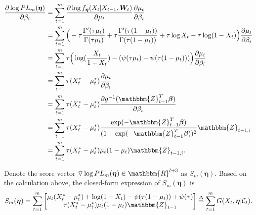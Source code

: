 \documentclass{article}
\theoremstyle{definition}
\begin{document}
\begin{equation*}
    \begin{aligned}
\frac{\partial \log PL_{m}(\bm{\eta})}{\partial \beta_i} & = \sum_{t=1}^m \frac{\partial \log f_{\bm{\eta}}(X_t|X_{t-1},\bm{W}_t)}{\partial \mu_t} \frac{\partial \mu_t}{\partial \beta_i} \\
&= \sum_{t=1}^m \Big(-\tau \frac{\Gamma'(\tau \mu_t)}{\Gamma(\tau \mu_t)}+\tau \frac{\Gamma'(\tau(1-\mu_t))}{\Gamma(\tau(1-\mu_t))}+\tau \log X_t -\tau \log(1-X_t) \Big)\frac{\partial \mu_t}{\partial \beta_i} \\
&= \sum_{t=1}^m  \tau\Big(\log(\frac{X_t}{1-X_t})-(\psi(\tau \mu_t)-\psi(\tau(1-\mu_t)))\Big)\frac{\partial \mu_t}{\partial \beta_i}\\
&= \sum_{t=1}^m  \tau(X_t^*-\mu_t^*) \frac{\partial \mu_t}{\partial \beta_i} \\
&= \sum_{t=1}^m \tau(X_t^*-\mu_t^*) \frac{\partial g^{-1}(\mathbbm{Z}_{t-1}^T \bm{\beta})}{\partial \beta_i} \\
&= \sum_{t=1}^m \tau(X_t^*-\mu_t^*) \frac{\exp(-\mathbbm{Z}_{t-1}^T \bm{\beta})}{(1+\exp(-\mathbbm{Z}_{t-1}^T \bm{\beta}))^2} \mathbbm{Z}_{t-1,i} \\
&= \sum_{t=1}^m \tau(X_t^*-\mu_t^*)\mu_t(1-\mu_t) \mathbbm{Z}_{t-1,i}.
\end{aligned}
\end{equation*}

Denote the score vector $ \triangledown \log PL_{m}(\bm{\eta}) \in \mathbbm{R}^{l+3}$ as $S_m(\bm{\eta})$. Based on the calculation above, the closed-form expression of $S_m(\bm{\eta})$ is
\small
\begin{equation}
\label{eq: score vector}
    S_m(\bm{\eta}) = \sum_{t=1}^m \begin{bmatrix} \mu_t(X_t^*-\mu_t^*)+\log(1-X_t)-\psi(\tau(1-\mu_t))+\psi(\tau) \\
    \tau(X_t^*-\mu_t^*)\mu_t(1-\mu_t) \mathbbm{Z}_{t-1}
    \end{bmatrix} \overset{\Delta}{=} \sum_{t=1}^m G(X_t,\bm{\eta}|
    \mathcal{C}_t).
\end{equation}
\normalsize
\end{document}
